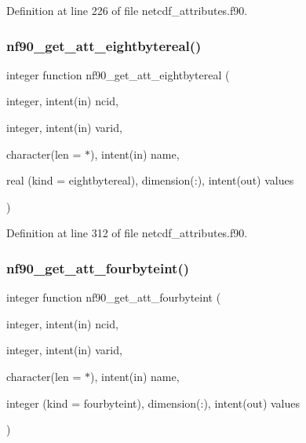 Definition at line 226 of file netcdf\+\_\+attributes.\+f90.

\mbox{\label{netcdf__attributes_8f90_a89dc7198d6cec513e5ada471a0fe7a37}} 
\subsubsection{\texorpdfstring{nf90\+\_\+get\+\_\+att\+\_\+eightbytereal()}{nf90\_get\_att\_eightbytereal()}}
{\footnotesize\ttfamily integer function nf90\+\_\+get\+\_\+att\+\_\+eightbytereal (\begin{DoxyParamCaption}\item[{integer, intent(in)}]{ncid,  }\item[{integer, intent(in)}]{varid,  }\item[{character(len = $\ast$), intent(in)}]{name,  }\item[{real (kind = eightbytereal), dimension(\+:), intent(out)}]{values }\end{DoxyParamCaption})}



Definition at line 312 of file netcdf\+\_\+attributes.\+f90.

\mbox{\label{netcdf__attributes_8f90_a4e3a573aadb247068a8ece7d28cdc929}} 
\subsubsection{\texorpdfstring{nf90\+\_\+get\+\_\+att\+\_\+fourbyteint()}{nf90\_get\_att\_fourbyteint()}}
{\footnotesize\ttfamily integer function nf90\+\_\+get\+\_\+att\+\_\+fourbyteint (\begin{DoxyParamCaption}\item[{integer, intent(in)}]{ncid,  }\item[{integer, intent(in)}]{varid,  }\item[{character(len = $\ast$), intent(in)}]{name,  }\item[{integer (kind = fourbyteint), dimension(\+:), intent(out)}]{values }\end{DoxyParamCaption})}



